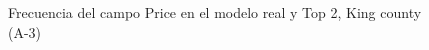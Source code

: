 \begin{figure}[H]
    \centering
    
    \caption{Frecuencia del campo Price en el modelo real y Top 2, King county (A-3)}
    \label{frecuency-top2-price}
\end{figure}